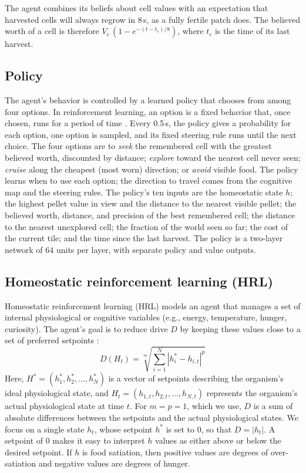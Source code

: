 \documentclass[12pt,fleqn]{article}
\begin{document}
The agent combines its beliefs about cell values with an expectation that harvested cells will always regrow in 8\,s, as a fully fertile patch does. The believed worth of a cell is therefore $V_c\,(1-e^{-(t-t_c)/8})$, where $t_c$ is the time of its last harvest.

\subsection{Policy}\label{sec:policy}

The agent's behavior is controlled by a learned policy that chooses from among four options. In reinforcement learning, an option is a fixed behavior that, once chosen, runs for a period of time \citep{sutton_between_1999}. Every 0.5\,s, the policy gives a probability for each option, one option is sampled, and its fixed steering rule runs until the next choice. The four options are to \emph{seek} the remembered cell with the greatest believed worth, discounted by distance; \emph{explore} toward the nearest cell never seen; \emph{cruise} along the cheapest (most worn) direction; or \emph{avoid} visible food. The policy learns when to use each option; the direction to travel comes from the cognitive map and the steering rules. The policy's ten inputs are the homeostatic state $h$; the highest pellet value in view and the distance to the nearest visible pellet; the believed worth, distance, and precision of the best remembered cell; the distance to the nearest unexplored cell; the fraction of the world seen so far; the cost of the current tile; and the time since the last harvest. The policy is a two-layer network of 64 units per layer, with separate policy and value outputs.

\subsection{Homeostatic reinforcement learning (HRL)}\label{sec:hrl}

Homeostatic reinforcement learning (HRL) models an agent that manages a set of internal physiological or cognitive variables (e.g., energy, temperature, hunger, curiosity). The agent's goal is to reduce drive $D$ by keeping these values close to a set of preferred setpoints \citep{keramati_homeostatic_2014}:
\begin{equation}\label{eq:model-drive}
  D\left(H_t\right)=\sqrt[m]{\sum_{i=1}^N\left|h_i^*-h_{i, t}\right|^p}
\end{equation}
Here, \(H^*=\left(h_1^*, h_2^*, \ldots, h_N^*\right)\) is a vector of setpoints describing the organism's ideal physiological state, and \(H_t=\left(h_{1, t}, h_{2, t}, \ldots, h_{N, t}\right)\) represents the organism's actual physiological state at time \(t\). For $m=p=1$, which we use, $D$ is a sum of absolute differences between the setpoints and the actual physiological states. We focus on a single state \(h_t\), whose setpoint \(h^*\) is set to \(0\), so that $D=|h_t|$. A setpoint of 0 makes it easy to interpret $h$ values as either above or below the desired setpoint. If $h$ is food satiation, then positive values are degrees of over-satiation and negative values are degrees of hunger.
\end{document}
